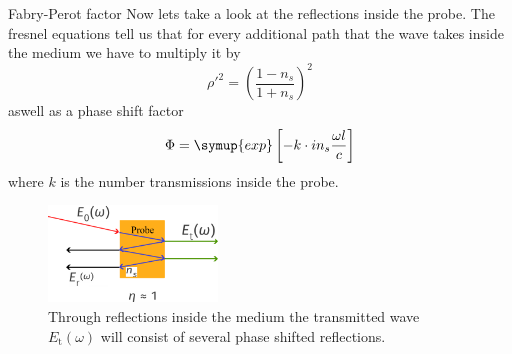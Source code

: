 \documentclass[aspectratio=1610, 9pt]{beamer}
\begin{document}


\begin{frame}{Fabry-Perot factor}
  Now lets take a look at the reflections inside the probe.
  The fresnel equations tell us that for every additional path that the wave takes inside the medium we have to multiply it by 
  \begin{equation}
    \rho'^2 = \left(\frac{1 - n_s}{1 + n_s}\right)^2
  \end{equation}
  aswell as a phase shift factor 
  \begin{equation}
    \Phi = \symup{exp}\left[-k \cdot i n_s \frac{\omega l}{c}\right]
  \end{equation}
  where $k$ is the number transmissions inside the probe.
  \begin{figure}
    \includegraphics[width=0.4\textwidth]{images/Perot.pdf}
    \caption{Through reflections inside the medium the transmitted wave $E_\text{t}(\omega)$ will consist of several phase shifted reflections.}
  \end{figure}
\end{frame}
\end{document}
